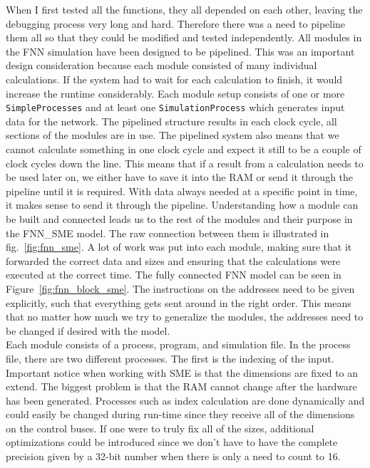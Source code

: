 When I first tested all the functions, they all depended on each other, leaving the debugging process very long and hard. Therefore there was a need to pipeline them all so that they could be modified and tested independently. 
All modules in the FNN simulation have been designed to be pipelined. This was an important design consideration because each module consisted of many individual calculations. If the system had to wait for each calculation to finish, it would increase the runtime considerably.
Each module setup consists of one or more \texttt{SimpleProcesses} and at least one \texttt{SimulationProcess} which generates input data for the network.
The pipelined structure results in each clock cycle, all sections of the modules are in use. The pipelined system also means that we cannot calculate something in one clock cycle and expect it still to be a couple of clock cycles down the line. This means that if a result from a calculation needs to be used later on, we either have to save it into the RAM or send it through the pipeline until it is required. With data always needed at a specific point in time, it makes sense to send it through the pipeline.
Understanding how a module can be built and connected leads us to the rest of the modules and their purpose in the FNN\_SME model. The raw connection between them is illustrated in fig.~\ref{fig:fnn_sme}. A lot of work was put into each module, making sure that it forwarded the correct data and sizes and ensuring that the calculations were executed at the correct time. The fully connected \acrshort{FNN} model can be seen in Figure~\ref{fig:fnn_block_sme}. The instructions on the addresses need to be given explicitly, such that everything gets sent around in the right order.
This means that no matter how much we try to generalize the modules, the addresses need to be changed if desired with the model. \\

Each module consists of a process, program, and simulation file. In the process file, there are two different processes. The first is the indexing of the input. Important notice when working with SME is that the dimensions are fixed to an extend. The biggest problem is that the RAM cannot change after the hardware has been generated. Processes such as index calculation are done dynamically and could easily be changed during run-time since they receive all of the dimensions on the control buses. If one were to truly fix all of the sizes, additional optimizations could be introduced since we don't have to have the complete precision given by a 32-bit number when there is only a need to count to 16.



